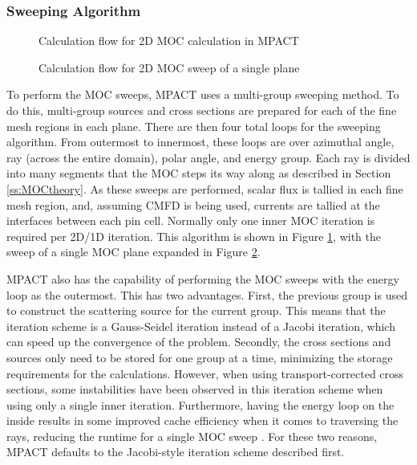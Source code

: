\subsubsection{Sweeping Algorithm}\label{sss:2d1dMOCsweepAlgorithm}

\begin{figure}[h]
  \centering
  
  \caption{Calculation flow for 2D MOC calculation in MPACT}\label{f:MOC-flowchart}
\end{figure}

\begin{figure}[h]
    \centering
    
    \caption{Calculation flow for 2D MOC sweep of a single plane}\label{f:MOC-sweep-flowchart}
\end{figure}

To perform the MOC sweeps, MPACT uses a multi-group sweeping method.  To do this, multi-group sources and cross sections are prepared for each of the fine mesh regions in each plane.  There are then four total loops for the sweeping algorithm.  From outermost to innermost, these loops are over azimuthal angle, ray (across the entire domain), polar angle, and energy group.  Each ray is divided into many segments that the MOC steps its way along as described in Section \ref{ss:MOCtheory}.  As these sweeps are performed, scalar flux is tallied in each fine mesh region, and, assuming CMFD is being used, currents are tallied at the interfaces between each pin cell.  Normally only one inner MOC iteration is required per 2D/1D iteration.  This algorithm is shown in Figure \ref{f:MOC-flowchart}, with the sweep of a single MOC plane expanded in Figure \ref{f:MOC-sweep-flowchart}.

MPACT also has the capability of performing the MOC sweeps with the energy loop as the outermost.  This has two advantages.  First, the previous group is used to construct the scattering source for the current group.  This means that the iteration scheme is a Gauss-Seidel iteration instead of a Jacobi iteration, which can speed up the convergence of the problem.  Secondly, the cross sections and sources only need to be stored for one group at a time, minimizing the storage requirements for the calculations.  However, when using transport-corrected cross sections, some instabilities have been observed in this iteration scheme when using only a single inner iteration.  Furthermore, having the energy loop on the inside results in some improved cache efficiency when it comes to traversing the rays, reducing the runtime for a single MOC sweep \cite{JacobiInscatterTechReport}.  For these two reasons, MPACT defaults to the Jacobi-style iteration scheme described first.

